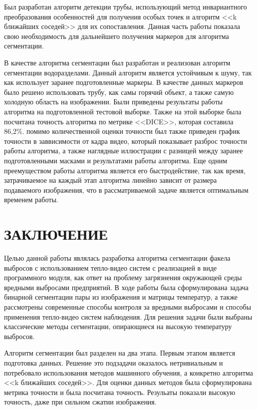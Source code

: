 \documentclass[14pt, a4paper]{extreport}
\begin{document}
	Был разработан алгоритм детекции трубы, использующий метод инвариантного преобразования особенностей для получения особых точек и алгоритм <<k ближайших соседей>> для их сопоставления. Данная часть работы показала свою необходимость для дальнейшего получения маркеров для алгоритма сегментации.
	
	В качестве алгоритма сегментации был разработан и реализован алгоритм сегментации водоразделами. Данный алгоритм является устойчивым к шуму, так как использует заранее подготовленные маркеры. В качестве данных маркеров было решено использовать трубу, как самы горячий объект, а также самую холодную область на изображении. Были приведены результаты работы алгоритма на подготовленной тестовой выборке. Также на этой выборке была посчитана точность алгоритма по метрике <<DICE>>, которая составила 86,2\%. помимо количественной оценки точности был также приведен график точности в заввисимости от кадра видео, который показывает разброс точности работы алгоритма, а также наглядные иллюстрации с разницей между заранее подготовленными масками и результатами работы алгоритма. Еще одним преемуществом работы алгоритма является его быстродействие, так как время, затрачиваемое на каждый этап алгоритма линейно зависит от размера подаваемого изображения, что в рассматриваемой задаче является оптимальным временем работы.

\chapter*{ЗАКЛЮЧЕНИЕ}
	Целью данной работы являлась разработка алгоритма сегментации факела выбросов с использованием тепло-видео систем с реализацией в виде программного модуля, как ответ на проблему загрязнения окружающей среды вредными выбросами предприятий. В ходе работы была сформулирована задача бинарной сегментации пары из изображения и матрицы температур, а также рассмотрены современные способы контроля за вредными выбросами и способы применения тепло-видео систем наблюдения. Для решения задачи были выбраны классические методы сегментации, опирающиеся на высокую температуру выбросов.
	
	Алгоритм сегментации был разделен на два этапа. Первым этапом является подготовка данных. Решение это подзадачи оказалось нетривиальным и потребовало использования методов машинного обучения, а конкретно алгоритма <<k ближайших соседей>>. Для оценки данных методов была сформулирована метрика точности и была посчитана точность. Резульаты показали высокую точность, даже при сильном сжатии изображения.
	
\end{document}
